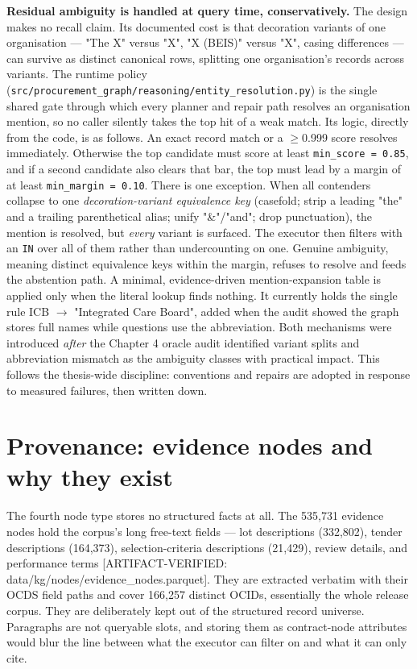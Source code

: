\documentclass[10pt]{article} %
\begin{document}
\textbf{Residual ambiguity is handled at query time, conservatively.} The design makes no recall claim. Its documented cost is that decoration variants of one organisation --- "The X" versus "X", "X (BEIS)" versus "X", casing differences --- can survive as distinct canonical rows, splitting one organisation's records across variants. The runtime policy (\texttt{src/procurement\_graph/reasoning/entity\_resolution.py}) is the single shared gate through which every planner and repair path resolves an organisation mention, so no caller silently takes the top hit of a weak match. Its logic, directly from the code, is as follows. An exact record match or a $\geq$0.999 score resolves immediately. Otherwise the top candidate must score at least \texttt{min\_score = 0.85}, and if a second candidate also clears that bar, the top must lead by a margin of at least \texttt{min\_margin = 0.10}. There is one exception. When all contenders collapse to one \emph{decoration-variant equivalence key} (casefold; strip a leading "the" and a trailing parenthetical alias; unify "\&"/"and"; drop punctuation), the mention is resolved, but \emph{every} variant is surfaced. The executor then filters with an \texttt{IN} over all of them rather than undercounting on one. Genuine ambiguity, meaning distinct equivalence keys within the margin, refuses to resolve and feeds the abstention path. A minimal, evidence-driven mention-expansion table is applied only when the literal lookup finds nothing. It currently holds the single rule ICB $\rightarrow$ "Integrated Care Board", added when the audit showed the graph stores full names while questions use the abbreviation. Both mechanisms were introduced \emph{after} the Chapter 4 oracle audit identified variant splits and abbreviation mismatch as the ambiguity classes with practical impact. This follows the thesis-wide discipline: conventions and repairs are adopted in response to measured failures, then written down.

\section{Provenance: evidence nodes and why they exist}\label{sec:provenance-evidence-nodes-and-why-they-e}

The fourth node type stores no structured facts at all. The 535,731 evidence nodes hold the corpus's long free-text fields --- lot descriptions (332,802), tender descriptions (164,373), selection-criteria descriptions (21,429), review details, and performance terms [ARTIFACT-VERIFIED: data/kg/nodes/evidence\_nodes.parquet]. They are extracted verbatim with their OCDS field paths and cover 166,257 distinct OCIDs, essentially the whole release corpus. They are deliberately kept out of the structured record universe. Paragraphs are not queryable slots, and storing them as contract-node attributes would blur the line between what the executor can filter on and what it can only cite.
\end{document}
